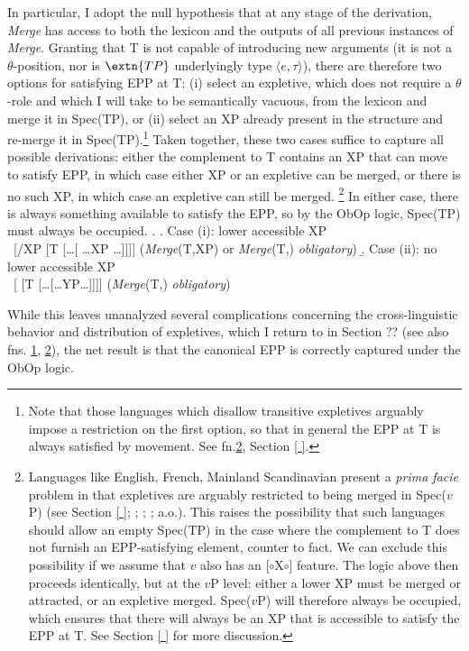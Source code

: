 \documentclass[11pt, letterpaper]{paper_nick}
\newcommand{\fm}[1]{[$\circ$#1$\circ$]}
\begin{document}
In particular, I adopt the null hypothesis that at any stage of the derivation, \emph{Merge} has access to both the lexicon and the outputs of all previous instances of \emph{Merge}. Granting that T is not capable of introducing new arguments (it is not a $\theta$-position, nor is $\extn{TP}$ underlyingly type $\langle e,\tau\rangle$), there are therefore two options for satisfying EPP at T: (i) select an expletive, which does not require a $\theta$-role and which I will take to be semantically vacuous, from the lexicon and merge it in Spec(TP), or (ii) select an XP already present in the structure and re-merge it in Spec(TP).\footnote{\label{transexp}Note that those languages which disallow transitive expletives arguably impose a restriction on the first option, so that in general the EPP at T is always satisfied by movement. See fn.\ref{expl1}, Section \ref{ }.} Taken together, these two cases suffice to capture all possible derivations: either the complement to T contains an XP that can move to satisfy EPP, in which case either XP or an expletive can be merged, or there is no such XP, in which case an expletive can still be merged.
\footnote{\label{expl1} Languages like English, French, Mainland Scandinavian present a \emph{prima facie} problem in that expletives are arguably restricted to being merged in Spec($v$P) (see Section \ref{ }; \citealt{richards06}; \citealt{deal09}; \citealt{wu}; a.o.). This raises the possibility that such languages should allow an empty Spec(TP) in the case where the complement to T does not furnish an EPP-satisfying element, counter to fact. We can exclude this possibility if we assume that $v$ also has an \fm{X} feature. The logic above then proceeds identically, but at the $v$P level: either a lower XP must be merged or attracted, or an expletive merged. Spec($v$P) will therefore always be occupied, which ensures that there will always be an XP that is accessible to satisfy the EPP at T. See Section \ref{ } for more discussion.} In either case, there is always something available to satisfy the EPP, so by the ObOp logic, Spec(TP) must always be occupied. 
\ex. \a. Case (i): lower accessible XP\\
\ [/XP [T [\ldots[ \ldots XP \ldots]]]] \hfill (\emph{Merge}(T,XP) or \emph{Merge}(T,) \emph{obligatory})
\b. Case (ii): no lower accessible XP\\
\ [ [T [\ldots[\ldots YP\ldots]]]] \hfill (\emph{Merge}(T,) \emph{obligatory})

While this leaves unanalyzed several complications concerning the cross-linguistic behavior and distribution of expletives, which I return to in Section ?? (see also fns. \ref{transexp}, \ref{expl1}), the net result is that the canonical EPP is correctly captured under the ObOp logic. 
\end{document}
